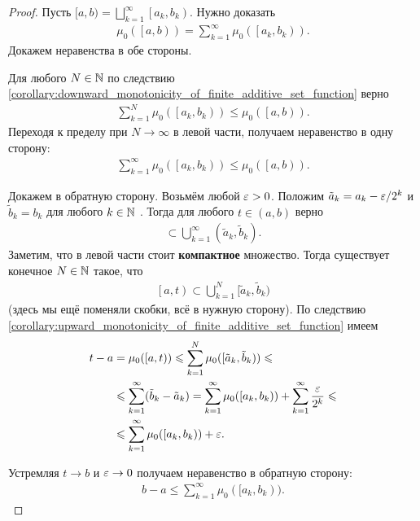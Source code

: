 \begin{proof}

 Пусть $[a, b) = \bigsqcup_{k=1}^{\infty} \left[a_k, b_k\right)$. Нужно доказать \begin{align*}
  \mu_0(\left[a, b\right)) = \sum_{k=1}^{\infty} \mu_0(\left[a_k, b_k\right))
 .\end{align*} Докажем неравенства в обе стороны.

 Для любого $N \in \mathbb{N}$ по следствию \ref{corollary:downward_monotonicity_of_finite_additive_set_function} верно
 \begin{align*}
  \sum_{k=1}^{N} \mu_0(\left[a_k, b_k\right)) \leqslant \mu_0(\left[a, b\right))
 .\end{align*}  Переходя к пределу при $N \to \infty$  в левой части, получаем неравенство в одну сторону:
 \begin{align*}
  \sum_{k=1}^{\infty} \mu_0(\left[a_k, b_k\right)) \leqslant \mu_0(\left[a, b\right))
 .\end{align*} 

 Докажем в обратную сторону. Возьмём любой $\varepsilon > 0$. Положим $\tilde a_k = a_k - \varepsilon / 2^{k}$  и $\tilde b_k = b_k$ для любого  $k \in \mathbb{N}$ . Тогда для любого $t \in (a, b)$  верно
 \begin{align*}
  [a,t] \subset \bigcup_{k=1}^{\infty} (\tilde a_k, \tilde b_k)
 .\end{align*} Заметим, что в левой части стоит \textbf{компактное} множество. Тогда существует конечное $N \in \mathbb{N}$  такое, что
 \begin{align*}
  \left[a, t\right) \subset \bigcup_{k=1}^{N} [\tilde a_k, \tilde b_k)
 \end{align*} (здесь мы ещё поменяли скобки, всё в нужную сторону). По следствию \ref{corollary:upward_monotonicity_of_finite_additive_set_function} имеем
 \begin{align*}
  t - a &= \mu_0([a, t)) \leqslant \sum_{k=1}^{N} \mu_0([\tilde a_k, \tilde b_k)) \leqslant \\
  &\leqslant \sum_{k=1}^{\infty} (\tilde b_k - \tilde a_k) = \sum_{k=1}^{\infty} \mu_0([a_k, b_k)) + \sum_{k=1}^{\infty} \frac{\varepsilon}{2^{k}} \leqslant \\
  &\leqslant \sum_{k=1}^{\infty} \mu_0([a_k, b_k)) + \varepsilon
 .\end{align*} 

 Устремляя $t \to b$  и $\varepsilon \to 0$  получаем неравенство в обратную сторону:
 \begin{align*}
  b - a \leqslant \sum_{k=1}^{\infty}  \mu_0([a_k, b_k))
 .\end{align*}
\end{proof}
